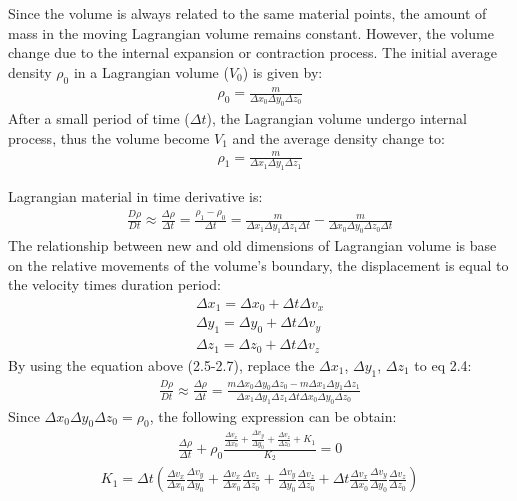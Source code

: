 Since the volume is always related to the same material points, the amount of mass in the moving Lagrangian volume remains constant. However, the volume change due to the internal expansion or contraction process. The initial average density $\rho_0$ in a Lagrangian volume ($V_0$) is given by:
\begin{align}
\rho_0 = \frac{m}{\Delta x_0 \Delta y_0 \Delta z_0}
\end{align}
After a small period of time ($\Delta t$), the Lagrangian volume undergo internal process, thus the volume become $V_1$ and the average density change to:
\begin{align}
\rho_1 = \frac{m}{\Delta x_1 \Delta y_1 \Delta z_1}
\end{align}

Lagrangian material in time derivative is:
\begin{align}
\frac{D\rho}{Dt} \approx \frac{\Delta \rho}{\Delta t} = \frac{\rho_1-\rho_0}{\Delta t}=\frac{m}{\Delta x_1 \Delta y_1 \Delta z_1\Delta t}-\frac{m}{\Delta x_0 \Delta y_0 \Delta z_0\Delta t}
\end{align}
The relationship between new and old dimensions of Lagrangian volume is base on the relative movements of the volume's boundary, the displacement is equal to the velocity times duration period:
\begin{align}
\Delta x_1 = \Delta x_0+\Delta t\Delta v_x\\
\Delta y_1 = \Delta y_0+\Delta t\Delta v_y\\
\Delta z_1 = \Delta z_0+\Delta t\Delta v_z
\end{align}
By using the equation above (2.5-2.7), replace the $\Delta x_1$, $\Delta y_1$, $\Delta z_1$ to eq 2.4:
\begin{align}
\frac{D\rho}{Dt} \approx \frac{\Delta \rho}{\Delta t} =\frac{m\Delta x_0 \Delta y_0 \Delta z_0-m\Delta x_1 \Delta y_1 \Delta z_1}{\Delta x_1 \Delta y_1 \Delta z_1\Delta t\Delta x_0 \Delta y_0 \Delta z_0}
\end{align}
Since $\Delta x_0 \Delta y_0 \Delta z_0=\rho_0$, the following expression can be obtain:
\begin{align}
\frac{\Delta \rho}{\Delta t}+\rho_0\frac{\frac{\Delta v_x}{\Delta x_0}+\frac{\Delta v_y}{\Delta y_0}+\frac{\Delta v_z}{\Delta z_0}+K_1}{K_2} = 0
\end{align}
\begin{align}
K_1 = \Delta t(\frac{\Delta v_x}{\Delta x_0}\frac{\Delta v_y}{\Delta y_0}+\frac{\Delta v_x}{\Delta x_0}\frac{\Delta v_z}{\Delta z_0}+\frac{\Delta v_y}{\Delta y_0}\frac{\Delta v_z}{\Delta z_0}+\Delta t \frac{\Delta v_x}{\Delta x_0}\frac{\Delta v_y}{\Delta y_0}\frac{\Delta v_z}{\Delta z_0})
\end{align}
